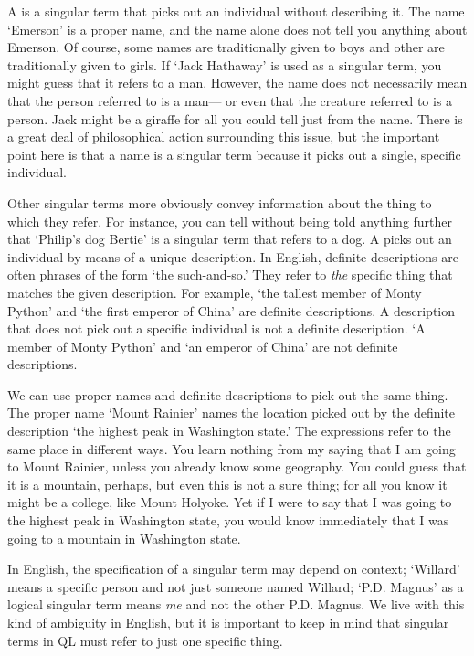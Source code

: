 A  is a singular term that picks out an individual without describing it. The name `Emerson' is a proper name, and the name alone does not tell you anything about Emerson. Of course, some names are traditionally given to boys and other are traditionally given to girls. If `Jack Hathaway' is used as a singular term, you might guess that it refers to a man. However, the name does not necessarily mean that the person referred to is a man--- or even that the creature referred to is a person. Jack might be a giraffe for all you could tell just from the name. There is a great deal of philosophical action surrounding this issue, but the important point here is that a name is a singular term because it picks out a single, specific individual.

Other singular terms more obviously convey information about the thing to which they refer. For instance, you can tell without being told anything further that `Philip's dog Bertie' is a singular term that refers to a dog. A  picks out an individual by means of a unique description. In English, definite descriptions are often phrases of the form `the such-and-so.' They refer to \emph{the} specific thing that matches the given description. For example, `the tallest member of Monty Python' and `the first emperor of China' are definite descriptions. A description that does not pick out a specific individual is not a definite description. `A member of Monty Python' and `an emperor of China' are not definite descriptions.

We can use proper names and definite descriptions to pick out the same thing. The proper name `Mount Rainier' names the location picked out by the definite description `the highest peak in Washington state.' The expressions refer to the same place in different ways. You learn nothing from my saying that I am going to Mount Rainier, unless you already know some geography. You could guess that it is a mountain, perhaps, but even this is not a sure thing; for all you know it might be a college, like Mount Holyoke. Yet if I were to say that I was going to the highest peak in Washington state, you would know immediately that I was going to a mountain in Washington state.

In English, the specification of a singular term may depend on context; `Willard' means a specific person and not just someone named Willard; `P.D. Magnus' as a logical singular term means \emph{me} and not the other P.D. Magnus. We live with this kind of ambiguity in English, but it is important to keep in mind that singular terms in QL must refer to just one specific thing.

